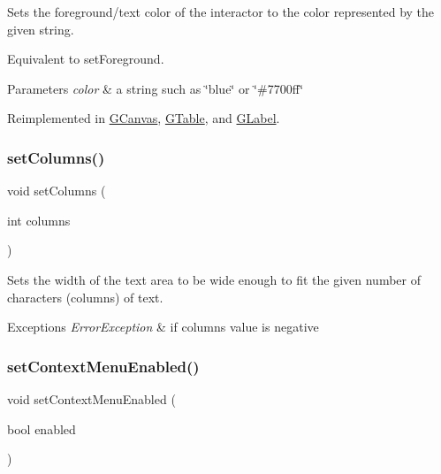 Sets the foreground/text color of the interactor to the color represented by the given string. 

Equivalent to set\+Foreground. 
\begin{DoxyParams}{Parameters}
{\em color} & a string such as \char`\"{}blue\char`\"{} or \char`\"{}\#7700ff\char`\"{} \\
\hline
\end{DoxyParams}


Reimplemented in \mbox{\hyperlink{classsgl_1_1GCanvas_a56845b1accc47aa881d05939eef6996c}{G\+Canvas}}, \mbox{\hyperlink{classsgl_1_1GTable_a56845b1accc47aa881d05939eef6996c}{G\+Table}}, and \mbox{\hyperlink{classsgl_1_1GLabel_a56845b1accc47aa881d05939eef6996c}{G\+Label}}.

\mbox{\label{classsgl_1_1GTextArea_a3f29cc2956a84cdbce6327f1da4d86e9}} 
\subsubsection{\texorpdfstring{set\+Columns()}{setColumns()}}
{\footnotesize\ttfamily void set\+Columns (\begin{DoxyParamCaption}\item[{int}]{columns }\end{DoxyParamCaption})\hspace{0.3cm}{\ttfamily [virtual]}}



Sets the width of the text area to be wide enough to fit the given number of characters (columns) of text. 


\begin{DoxyExceptions}{Exceptions}
{\em Error\+Exception} & if columns value is negative \\
\hline
\end{DoxyExceptions}
\mbox{\label{classsgl_1_1GTextArea_a1a83404ffa5c72d747681b3505e73001}} 
\subsubsection{\texorpdfstring{set\+Context\+Menu\+Enabled()}{setContextMenuEnabled()}}
{\footnotesize\ttfamily void set\+Context\+Menu\+Enabled (\begin{DoxyParamCaption}\item[{bool}]{enabled }\end{DoxyParamCaption})\hspace{0.3cm}{\ttfamily [virtual]}}




